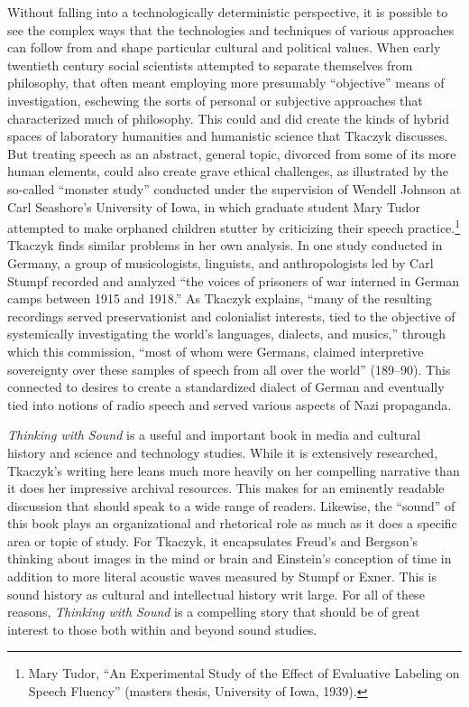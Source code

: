 \documentclass{tufte-handout}
\begin{document}
Without falling into a technologically deterministic perspective, it is
possible to see the complex ways that the technologies and techniques of
various approaches can follow from and shape particular cultural and
political values. When early twentieth century social scientists
attempted to separate themselves from philosophy, that often meant
employing more presumably ``objective'' means of investigation,
eschewing the sorts of personal or subjective approaches that
characterized much of philosophy. This could and did create the kinds of
hybrid spaces of laboratory humanities and humanistic science that
Tkaczyk discusses. But treating speech as an abstract, general topic,
divorced from some of its more human elements, could also create grave
ethical challenges, as illustrated by the so-called ``monster study''
conducted under the supervision of Wendell Johnson at Carl Seashore's
University of Iowa, in which graduate student Mary Tudor attempted to
make orphaned children stutter by criticizing their speech
practice.\footnote{Mary Tudor, ``An Experimental Study of the Effect of
  Evaluative Labeling on Speech Fluency'' (master\textquotesingle s
  thesis, University of Iowa, 1939).} Tkaczyk finds similar problems in
her own analysis. In one study conducted in Germany, a group of
musicologists, linguists, and anthropologists led by Carl Stumpf
recorded and analyzed ``the voices of prisoners of war interned in
German camps between 1915 and 1918.'' As Tkaczyk explains, ``many of the
resulting recordings served preservationist and colonialist interests,
tied to the objective of systemically investigating the world's
languages, dialects, and musics,'' through which this commission, ``most
of whom were Germans, claimed interpretive sovereignty over these
samples of speech from all over the world'' (189--90). This connected to
desires to create a standardized dialect of German and eventually tied
into notions of radio speech and served various aspects of Nazi
propaganda.

\emph{Thinking with Sound} is a useful and important book in media and
cultural history and science and technology studies. While it is
extensively researched, Tkaczyk's writing here leans much more heavily
on her compelling narrative than it does her impressive archival
resources. This makes for an eminently readable discussion that should
speak to a wide range of readers. Likewise, the ``sound'' of this book
plays an organizational and rhetorical role as much as it does a
specific area or topic of study. For Tkaczyk, it encapsulates Freud's
and Bergson's thinking about images in the mind or brain and Einstein's
conception of time in addition to more literal acoustic waves measured
by Stumpf or Exner. This is sound history as cultural and intellectual
history writ large. For all of these reasons, \emph{Thinking with Sound}
is a compelling story that should be of great interest to those both
within and beyond sound studies.
\end{document}
